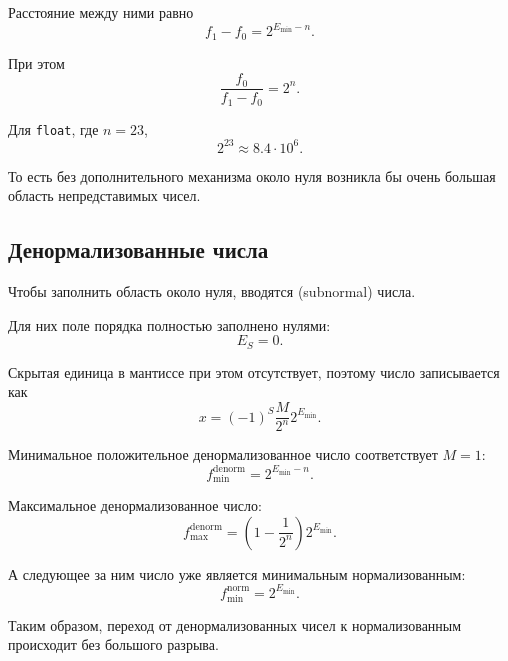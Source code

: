 \documentclass[../final.tex]{subfiles}
\begin{document}
Расстояние между ними равно
%
\begin{equation*}
    f_1-f_0
    =
    2^{E_{\min}-n}.
\end{equation*}

При этом
%
\begin{equation*}
    \frac{f_0}{f_1-f_0}
    =
    2^n.
\end{equation*}

Для \texttt{float}, где $n=23$,
%
\[
    2^{23}
    \approx
    8.4\cdot10^6.
\]

То есть без дополнительного механизма около нуля возникла бы
очень большая область непредставимых чисел.


\subsection{Денормализованные числа}

Чтобы заполнить область около нуля, вводятся
 (subnormal) числа.

Для них поле порядка полностью заполнено нулями:
%
\[
    E_S=0.
\]

Скрытая единица в мантиссе при этом отсутствует, поэтому число
записывается как
%
\begin{equation*}
    x
    =
    (-1)^S
    \frac{M}{2^n}
    2^{E_{\min}}.
\end{equation*}

Минимальное положительное денормализованное число соответствует
$M=1$:
%
\begin{equation*}
    f_{\min}^{\mathrm{denorm}}
    =
    2^{E_{\min}-n}.
\end{equation*}

Максимальное денормализованное число:
%
\begin{equation*}
    f_{\max}^{\mathrm{denorm}}
    =
    \left(
        1-\frac{1}{2^n}
    \right)
    2^{E_{\min}}.
\end{equation*}

А следующее за ним число уже является минимальным
нормализованным:
%
\begin{equation*}
    f_{\min}^{\mathrm{norm}}
    =
    2^{E_{\min}}.
\end{equation*}

Таким образом, переход от денормализованных чисел к
нормализованным происходит без большого разрыва.
\end{document}
